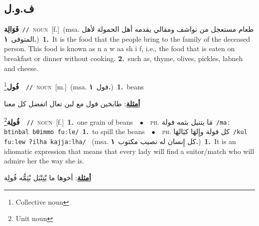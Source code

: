 \documentclass[10pt,a4paper,twoside]{article} %
\begin{document}
\begin{multicols}{2}
\vspace{-3mm}
\subsection*{\color{blue}\foreignlanguage{arabic}{ف.و.ل}\color{blue}{}} 

{\setlength\topsep{0pt}\textbf{\foreignlanguage{arabic}{فَوَالِة}}\ {\color{gray}\texttt{//}\color{black}}\ \textsc{noun}\ [f.]\ \color{gray}(msa. \foreignlanguage{arabic}{طعام مستعجل من نواشف ومقالي يقدمه أهل الحمولة لأهل المتوفى}~\foreignlanguage{arabic}{\textbf{١.}})\color{black}\ \textbf{1.}~It is the food that the people bring to the family of the deceased person. This food is known as n a w aa sh i f, i.e., the food that is eaten on breakfast or dinner without cooking.  \textbf{2.}~such as, thyme, olives, pickles, labneh and cheese.\ } \vspace{2mm}

{\setlength\topsep{0pt}\textbf{\foreignlanguage{arabic}{فُول}}\footnote{Collective noun}\ \ {\color{gray}\texttt{//}\color{black}}\ \textsc{noun}\ [m.]\ \color{gray}(msa. \foreignlanguage{arabic}{فول}~\foreignlanguage{arabic}{\textbf{١.}})\color{black}\ \textbf{1.}~beans\  \begin{flushright}\color{gray}\foreignlanguage{arabic}{\textbf{\underline{\foreignlanguage{arabic}{أمثلة}}}: طابخين فول مع لبن تعال اتفضل كل معنا}\end{flushright}\color{black}} \vspace{2mm}

{\setlength\topsep{0pt}\textbf{\foreignlanguage{arabic}{فُولِة}}\footnote{Unit noun}\ \ {\color{gray}\texttt{//}\color{black}}\ \textsc{noun}\ [f.]\ \textbf{1.}~one grain of beans\ \ $\bullet$\ \ \textsc{ph.} \color{gray} \foreignlanguage{arabic}{مَا يتنيل بثمه فولة}\color{black}\ {\color{gray}\texttt{/{\sffamily maː btinbal bθimmo fuːle}/}\color{black}}\ \textbf{1.}~to spill the beans\ \ $\bullet$\ \ \textsc{ph.} \color{gray} \foreignlanguage{arabic}{كل فولة وإِلهَا كيَالهَا}\color{black}\ {\color{gray}\texttt{/{\sffamily kul fuːlew ʔilha kajjaːlha}/}\color{black}}\ \color{gray} (msa. \foreignlanguage{arabic}{كل إِنسان له نصيب مكتوب}~\foreignlanguage{arabic}{\textbf{١.}})\color{black}\ \textbf{1.}~It is an idiomatic expression that means that every lady will find a suitor/match who will admire her the way she is.\  \begin{flushright}\color{gray}\foreignlanguage{arabic}{\textbf{\underline{\foreignlanguage{arabic}{أمثلة}}}: أخوها ما يْتِنْيَل بْثِمُّه فُولِة}\end{flushright}\color{black}} \vspace{2mm}


\end{multicols}
\end{document}
